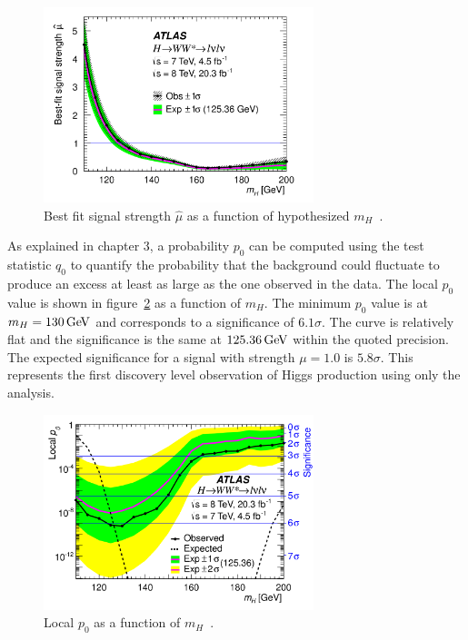 \begin{figure}[h!]
  \centering
  \captionsetup{justification=centering}

  \includegraphics[width=0.7\textwidth]{figures/mu_mass}
  \caption{Best fit signal strength $\hat{\mu}$ as a function of hypothesized $m_{H}$~\cite{WW2015}.}
  \label{fig:mu-val}
\end{figure}

As explained in chapter 3, a probability $p_0$ can be computed using the test statistic $q_0$ to quantify the probability that the background could fluctuate to produce an excess at least as large as the one observed in the data. The local $p_0$ value is shown in figure~\ref{fig:p0} as a function of $m_H$. The minimum $p_0$ value is at $m_H = 130 \GeV$ and corresponds to a significance of $6.1\sigma$. The curve is relatively flat and the significance is the same at $125.36 \GeV$ within the quoted precision. The expected significance for a signal with strength $\mu = 1.0$ is $5.8\sigma$. This represents the first discovery level observation of Higgs production using only the \HWWfull analysis. 

\begin{figure}[h!]
  \centering
  \captionsetup{justification=centering}

  \includegraphics[width=0.7\textwidth]{figures/WW_p0}
  \caption{Local $p_0$ as a function of $m_H$~\cite{WW2015}.}
  \label{fig:p0}
\end{figure}

